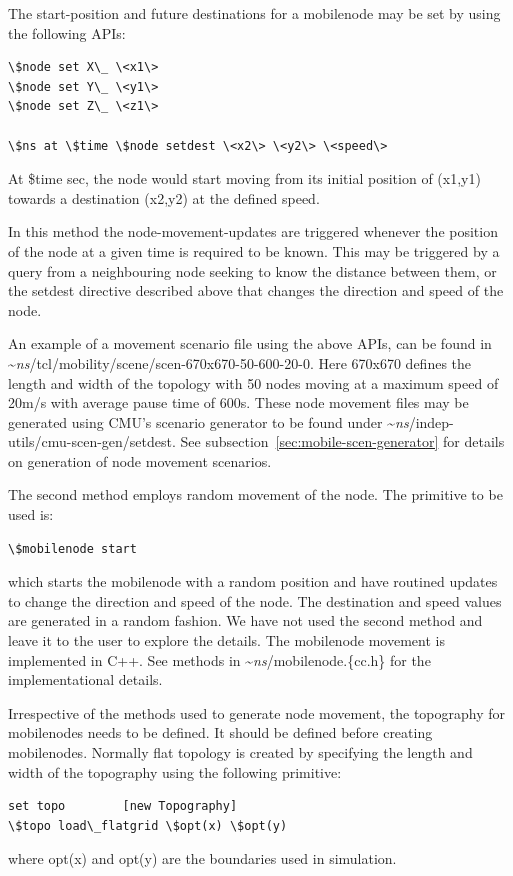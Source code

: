 The start-position and future destinations for a mobilenode may be set
by using the following APIs:
\begin{verbatim}
\$node set X\_ \<x1\>
\$node set Y\_ \<y1\>
\$node set Z\_ \<z1\>

\$ns at \$time \$node setdest \<x2\> \<y2\> \<speed\> 
\end{verbatim}
At \$time sec, the node would start moving from its initial position 
of (x1,y1) towards a destination (x2,y2) at the defined speed.

In this method the node-movement-updates are triggered whenever the
position of the node at a given time is required to be known. This
may be triggered by a query from a neighbouring node seeking to know
the distance between them, or the setdest directive
described above that changes the direction and speed of the node.

An example of a movement scenario file using the above APIs, can be
found in \textasciitilde\emph{ns}/{tcl/mobility/scene/scen-670x670-50-600-20-0}. Here
670x670 defines the length and width of the topology with 50 nodes
moving at a maximum speed of 20m/s with average pause time of
600s. These node movement files may be generated using CMU's scenario
generator to be found under
\textasciitilde\emph{ns}/{indep-utils/cmu-scen-gen/setdest}. See 
subsection~\ref{sec:mobile-scen-generator} for details on generation
of node movement scenarios. 

The second method employs random movement of the node. The primitive
to be used is:
\begin{verbatim}
\$mobilenode start
\end{verbatim} %
which starts the mobilenode with a random position and have routined
updates to change the direction and speed of the node. The destination
and speed values are generated in a random fashion. We have not used
the second method and leave it to the user to 
explore the details. 
The mobilenode movement is implemented in C++. See methods in
\textasciitilde\emph{ns}/{mobilenode.\{cc.h\}} for the implementational details.

Irrespective of the methods used to generate node movement,
the topography for mobilenodes needs to be defined. It should be
defined before creating mobilenodes. Normally flat topology is created
by specifying the length and width of the topography using the
following primitive:
\begin{verbatim}    
set topo        [new Topography]
\$topo load\_flatgrid \$opt(x) \$opt(y)
\end{verbatim} %
where opt(x) and opt(y) are the boundaries used in simulation.

